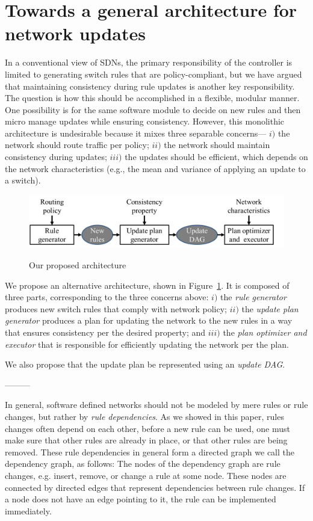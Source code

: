 \section{Towards a general architecture for network updates}
\label{sec:discussion}

In a conventional view of SDNs, the primary responsibility of the controller is limited to generating switch rules that are policy-compliant, but we have argued that maintaining consistency during rule updates is another key responsibility. The question is how this should be accomplished in a flexible, modular manner. One possibility is for the same software module to decide on new rules and then micro manage updates while ensuring consistency. However, this monolithic architecture is undesirable because it mixes three separable concerns--- $i)$ the network should route traffic per policy; $ii)$ the network should maintain consistency during updates; $iii)$ the updates should be efficient, which depends on the network characteristics (e.g., the mean and variance of applying an update to a switch).

\begin{figure}[t!]
  \centering
  \includegraphics[width=\columnwidth]{figures/arch.png}\\
  \caption{Our proposed architecture}\label{fig:arch}
\end{figure}

We propose an alternative architecture, shown in Figure~\ref{fig:arch}. It is composed of three parts, corresponding to the three concerns above: $i)$ the {\em rule generator} produces new switch rules that comply with network policy; $ii)$ the {\em update plan generator} produces a plan for updating the network to the new rules in a way that ensures consistency per the desired property; and $iii)$  the {\em plan optimizer and executor} that is responsible for efficiently updating the network per the plan.

We also propose that the update plan be represented using an {\em update DAG}. 

---------

In general, software defined networks should not be modeled by mere rules or rule changes, but rather by \emph{rule dependencies}. As we showed in this paper, rules changes often depend on each other, before a new rule can be used, one must make sure that other rules are already in place, or that other rules are being removed. These rule dependencies in general form a directed graph we call the dependency graph, as follows: The nodes of the dependency graph are rule changes, e.g. insert, remove, or change a rule at some node. These nodes are connected by directed edges that represent dependencies between rule changes. If a node does not have an edge pointing to it, the rule can be implemented immediately.

